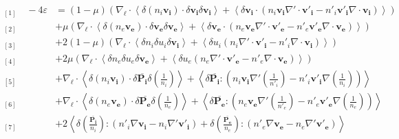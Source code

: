 \begin{equation} \boxed{\begin{array}{ll}\label{eq:turb_bi_EL}
{}_{[1]} \quad  - 4  \varepsilon &= \left(1-\mu\right)\left( \nabla_{\boldsymbol{\ell}} \cdot\left<  \delta \left(n_i \boldsymbol{v_i}\right) \cdot \delta \boldsymbol{v_i}\delta \boldsymbol{v_i} \right> +\left<\delta \boldsymbol{v_i}\cdot \left(n_i \boldsymbol{v_i}   \nabla' \cdot \boldsymbol{v'_i}- n'_i \boldsymbol{v'_i} \nabla \cdot \boldsymbol{v_i}\right)\right>\right)  \\ %
{}_{[2]} \quad &+ \mu\left( \nabla_{\boldsymbol{\ell}} \cdot\left<  \delta \left(n_e \boldsymbol{v_e}\right) \cdot \delta \boldsymbol{v_e}\delta \boldsymbol{v_e} \right> +\left<\delta \boldsymbol{v_e}\cdot \left(n_e \boldsymbol{v_e}   \nabla' \cdot \boldsymbol{v'_e}- n'_e \boldsymbol{v'_e} \nabla \cdot \boldsymbol{v_e}\right)\right>\right)  \\ %
{}_{[3]} \quad  &+ 2  \left(1-\mu\right) \left(\nabla_{\boldsymbol{\ell}} \cdot\left<  \delta n_i  \delta u_i\delta \boldsymbol{v_i} \right> +\left<\delta u_i  \left(n_i \nabla' \cdot \boldsymbol{v'_i}- n'_i \nabla \cdot \boldsymbol{v_i}\right)\right> \right) \\ %
{}_{[4]} \quad  &+ 2  \mu \left(\nabla_{\boldsymbol{\ell}} \cdot\left<  \delta n_e  \delta u_e\delta \boldsymbol{v_e} \right> +\left<\delta u_e  \left(n_e \nabla' \cdot \boldsymbol{v'_e}- n'_e \nabla \cdot \boldsymbol{v_e}\right)\right> \right) \\ %
{}_{[5]} \quad  &+ \nabla_{\boldsymbol{\ell}} \cdot\left<  \delta \left(n_i \boldsymbol{v_i}\right) \cdot \delta \overline{\boldsymbol{P_i}} \delta \left(\frac{1}{n_i}\right)\right> + \left<\delta \overline{\boldsymbol{P_i}} : \left(n_i \boldsymbol{v_i}  \nabla' \left(\frac{1}{n'_i}\right) - n'_i \boldsymbol{v'_i} \nabla \left(\frac{1}{n_i}\right)\right)\right>  \\ %
{}_{[6]} \quad  &+ \nabla_{\boldsymbol{\ell}} \cdot\left<  \delta \left(n_e \boldsymbol{v_e}\right) \cdot \delta \overline{\boldsymbol{P_e}} \delta \left(\frac{1}{n_e}\right)\right> + \left<\delta \overline{\boldsymbol{P_e}} : \left(n_e \boldsymbol{v_e}  \nabla' \left(\frac{1}{n'_e}\right) - n'_e \boldsymbol{v'_e} \nabla \left(\frac{1}{n_e}\right)\right)\right>  \\ %
{}_{[7]} \quad  &+ 2 \left<\delta \left(\frac{\overline{\boldsymbol{P_i}}}{n_i}\right) : \left(n'_i \nabla\boldsymbol{v_i} - n_i \nabla' \boldsymbol{v'_i}\right) +\delta \left(\frac{\overline{\boldsymbol{P_e}}}{n_e}\right) : \left(n'_e \nabla\boldsymbol{v_e} - n_e \nabla' \boldsymbol{v'_e}\right) \right>  \\ %

\end{array}}
\end{equation}
